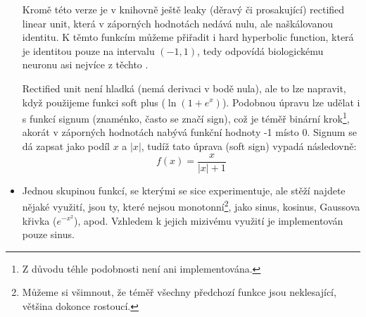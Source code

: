 \documentclass[12pt]{report}			%
\begin{document}
\begin{itemize}
						Kromě této verze je v knihovně ještě leaky (děravý či prosakující) rectified linear unit, která v záporných hodnotách nedává nulu, ale naškálovanou identitu. K těmto funkcím můžeme přiřadit i hard hyperbolic function, která je identitou pouze na intervalu $(-1, 1)$, tedy odpovídá biologickému neuronu asi nejvíce z těchto .
						
						Rectified unit není hladká (nemá derivaci v bodě nula), ale to lze napravit, když použijeme funkci soft plus ($\ln\left(1+e^x\right)$). Podobnou úpravu lze udělat i s funkcí signum (znaménko, často se značí sign), což je téměř binární krok\footnote{Z důvodu téhle podobnosti není ani implementována.}, akorát v záporných hodnotách nabývá funkční hodnoty -1 místo 0. Signum se dá zapsat jako podíl $x$ a $|x|$, tudíž tato úprava (soft sign) vypadá následovně:
						\begin{equation} f(x) = \frac{x}{|x| + 1} \end{equation}
						
					\item Jednou skupinou funkcí, se kterými se sice experimentuje, ale stěží najdete nějaké využití, jsou ty, které nejsou monotonní\footnote{Můžeme si všimnout, že téměř všechny předchozí funkce jsou neklesající, většina dokonce rostoucí.}, jako sinus, kosinus, Gaussova křivka ($e^{-x^2}$), apod. Vzhledem k jejich mizivému využití je implementován pouze sinus.
					

\end{itemize}
\end{document}
